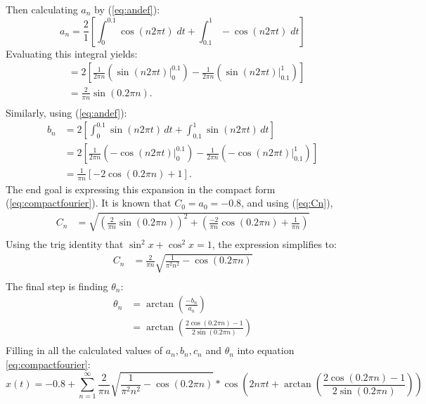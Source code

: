\documentclass[a4paper, onecolumn, 12pt]{IEEEtran}
\begin{document}
\noindent Then calculating $a_n$ by (\ref{eq:andef}):
\begin{equation} %
    a_n = \frac{2}{1} \left[ \int_{0}^{0.1} \cos (n 2 \pi t ) \; dt + \int_{0.1}^{1}- \cos ( n 2 \pi t) \; dt\right]\nonumber
\end{equation}
Evaluating this integral yields:
\begin{align} 
    &= 2 \left[ \frac{1}{2 \pi n} \left(\sin (n 2 \pi t) \bigg|_{0}^{0.1} \right) - \frac{1}{2 \pi n} \left(\sin (n 2 \pi t) \bigg|_{0.1}^{1} \right) \right] \nonumber \\    
    &= \frac{2}{\pi n} \sin (0.2 \pi n).\nonumber \\
\end{align}
Similarly, using (\ref{eq:andef}):
\begin{align}
b_n &= 2 \left[ \int_{0}^{0.1} \sin (n 2 \pi t) \, dt + \int_{0.1}^{1} \sin (n 2 \pi t) \, dt \right] \nonumber \\
 &= 2\left[ \frac{1}{2 \pi n} \left( - \cos (n 2 \pi t)\bigg|_{0}^{0.1} \right) - \frac{1}{2 \pi n} \left( - \cos (n 2 \pi t)\bigg|_{0.1}^{1} \right) \right] \nonumber \\
 &= \frac{1}{\pi n}\left[ -2 \cos (0.2 \pi n) + 1 \right].
\end{align}
The end goal is expressing this expansion in the compact form (\ref{eq:compactfourier}). It is known that $C_0=a_0=-0.8$, and using (\ref{eq:Cn}),
\begin{align}
C_n &= \sqrt{\left( \frac{2}{\pi n} \sin (0.2 \pi n) \right)^2 + \left( \frac{-2}{\pi n} \cos (0.2 \pi n) + \frac{1}{\pi n} \right)} \nonumber \\
\end{align}
Using the trig identity that $\sin^2 x + \cos^2 x = 1$, the expression simplifies to:
\begin{align}
C_n &= \frac{2}{\pi n}\sqrt{ \frac{1}{\pi^2 n^2} - \cos (0.2 \pi n)} \nonumber \\
\end{align}
The final step is finding $\theta_n$:
\begin{align}
    \theta_n &= \arctan \left( \frac{-b_n}{a_n} \right) \nonumber \\
    &= \arctan \left(\frac{2 \cos (0.2 \pi n) -1}{2 \sin (0.2 \pi n)}\right) \\
\end{align}
Filling in all the calculated values of $a_n, b_n, c_n$ and $\theta_n$ into equation  \ref{eq:compactfourier}: %
\begin{equation}
    x(t) = -0.8 + \sum_{n=1}^{\infty} \frac{2}{\pi n} \sqrt{ \frac{1}{\pi^2 n^2} - \cos (0.2 \pi n)} * \cos \left( 2 n \pi t + \arctan \left( \frac{2 \cos (0.2 \pi n) -1}{2 \sin (0.2 \pi n)} \right) \right)
\end{equation}
\end{document}
